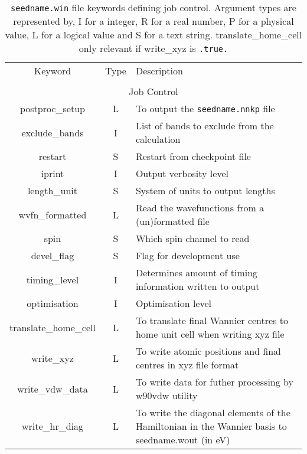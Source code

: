 \clearpage

\begin{table}
\begin{center}
\begin{tabular}{|c|c|p{6cm}|}
\hline
Keyword & Type & Description \\
        &      &             \\
\hline\hline
\multicolumn{3}{|c|}{Job Control} \\
\hline
{\sc postproc\_setup }   & L & To output the {\tt seedname.nnkp} file \\
{\sc exclude\_bands }   & I & List of bands to exclude from the calculation \\
{\sc restart }   & S & Restart from checkpoint file \\
{\sc iprint }   & I & Output verbosity level \\
{\sc length\_unit }   & S & System of units to output lengths \\
{\sc wvfn\_formatted }   & L & Read the wavefunctions from a  (un)formatted file  \\
{\sc spin }   & S & Which spin channel to read \\
{\sc devel\_flag }   & S & Flag for development use \\
{\sc timing\_level } & I & Determines amount of timing information
written to output \\
{\sc optimisation } & I & Optimisation level \\
{\sc translate\_home\_cell } & L & To translate final Wannier centres
to home unit cell when writing xyz file\\
{\sc write\_xyz }  & L & To write atomic positions and final centres in xyz file format \\
{\sc write\_vdw\_data }  & L & To write data for futher processing by w90vdw utility\\
{\sc write\_hr\_diag }  & L & To write the diagonal elements of
the Hamiltonian in the Wannier basis to seedname.wout (in eV)\\
\hline
\end{tabular}
\caption[win file keywords.]
{{\tt seedname.win} file keywords defining job control.  Argument types
are represented by, I for a integer, R for a real number, P for a
physical value, L for a logical value and S for a text string. {\sc
  translate\_home\_cell } only relevant if {\sc write\_xyz} is
\texttt{.true.}}
\label{parameter_keywords2}
\end{center}
\end{table}





